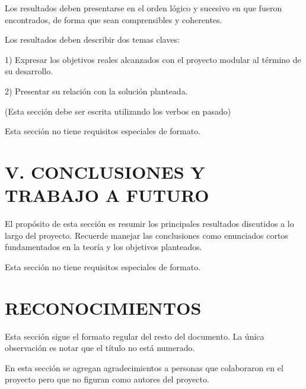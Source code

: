 ﻿\documentclass[10pt,twocolumn]{article}
\begin{document}
Los resultados deben presentarse en el orden lógico y sucesivo en que fueron encontrados, de forma que sean comprensibles y coherentes.

Los resultados deben describir dos temas claves:

1) Expresar los objetivos reales alcanzados con el proyecto modular al término de su desarrollo.

2) Presentar su relación con la solución planteada.

(Esta sección debe ser escrita utilizando los verbos en pasado)

Esta sección no tiene requisitos especiales de formato.

\section*{V. CONCLUSIONES Y TRABAJO A FUTURO}
El propósito de esta sección es resumir los principales resultados discutidos a lo largo del proyecto. Recuerde manejar las conclusiones como enunciados cortos fundamentados en la teoría y los objetivos planteados.

Esta sección no tiene requisitos especiales de formato.

\section*{RECONOCIMIENTOS}
Esta sección sigue el formato regular del resto del documento. La única observación es notar que el título no está numerado.

En esta sección se agregan agradecimientos a personas que colaboraron en el proyecto pero que no figuran como autores del proyecto.
\end{document}
